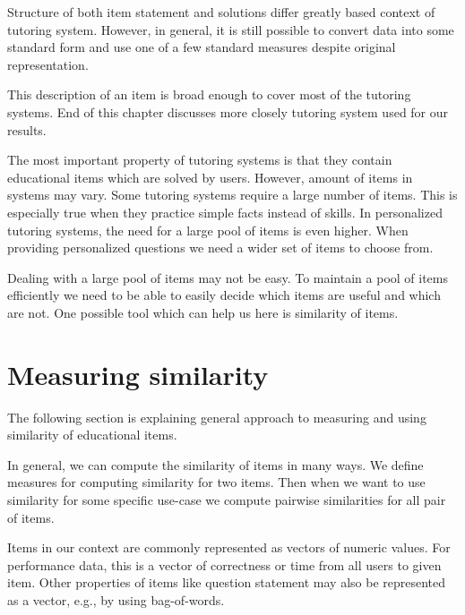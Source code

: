 \documentclass[
  digital, %
  table,   %
  nolof,     %
  nolot,     %
  nocover,
  color
]{fithesis3}
\begin{document}
Structure of both item statement and solutions differ greatly based context of tutoring system. However, in general, it is still possible to convert data into some standard form and use one of a few standard measures despite original representation.

This description of an item is broad enough to cover most of the tutoring systems. End of this chapter discusses more closely tutoring system used for our results.


The most important property of tutoring systems is that they contain educational items which are solved by users. However, amount of items in systems may vary. Some tutoring systems require a large number of items. This is especially true when they practice simple facts instead of skills. In personalized tutoring systems, the need for a large pool of items is even higher. When providing personalized questions we need a wider set of items to choose from.


Dealing with a large pool of items may not be easy. To maintain a pool of items efficiently we need to be able to easily decide which items are useful and which are not. One possible tool which can help us here is similarity of items.


\section{Measuring similarity}\label{measuring-similarity}

The following section is explaining general approach to measuring and using similarity of educational items.


In general, we can compute the similarity of items in many ways. We define measures for computing similarity for two items. Then when we want to use similarity for some specific use-case we compute pairwise similarities for all pair of items.

Items in our context are commonly represented as vectors of numeric values. For performance data, this is a vector of correctness or time from all users to given item. Other properties of items like question statement may also be represented as a vector, e.g., by using bag-of-words.
\end{document}
